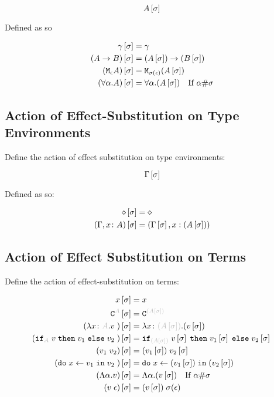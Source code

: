 {$$A\left[\sigma\right]$$

Defined as so

\begin{align}
    \gamma\left[\sigma\right] &= \gamma \\
    (A\rightarrow B)\left[\sigma\right] &= (A\left[\sigma\right])\rightarrow (B\left[\sigma\right]) \\
    (\texttt{M}_{\epsilon}{A})\left[\sigma\right] &= \texttt{M}_{\sigma(\epsilon)}{(A\left[\sigma\right])}\\
    (\forall \alpha. A)\left[\sigma\right] &= \forall \alpha. (A\left[\sigma\right])\quad\text{If $\alpha\#\sigma$}
\end{align}


\subsection{Action of Effect-Substitution on Type Environments}

Define the action of effect substitution on type environments:

$$\Gamma\left[\sigma\right]$$

Defined as so:

\begin{align*}
    \diamond\left[\sigma\right] & = \diamond \\
    (\Gamma, x\colon A)\left[\sigma\right] &= (\Gamma\left[\sigma\right], x:(A\left[\sigma\right]))\\
\end{align*}


\subsection{Action of Effect Substitution on Terms}

Define the action of effect-substitution on terms:

\begin{align}
    x\ssi & = x \\
    \const{A}\ssi & = \const{(A\ssi)} \\
    (\lam{x}{A}{v})\ssi &= \lam{x}{(A\ssi)}{(v\ssi)}\\
    (\pifthenelse{A}{v}{v_1}{v_2})\ssi &= \pifthenelse{(A\ssi)}{v\ssi}{v_1\ssi}{v_2\ssi}\\
    (\apply{v_1}{v_2})\ssi&= \apply{(v_1\ssi)}{v_2\ssi}\\
    (\doin{x}{v_1}{v_2})\ssi&= \doin{x}{(v_1\ssi)}{(v_2\ssi)}\\
    (\elam{\a}{v})\ssi & = \elam{\a}{(v\ssi)}\qt{If $\a\#\si$}\\
    (\eapp{v}{\e})\ssi & = \eapp{(v\ssi)}{\si(\e)}\\
\end{align}


}
